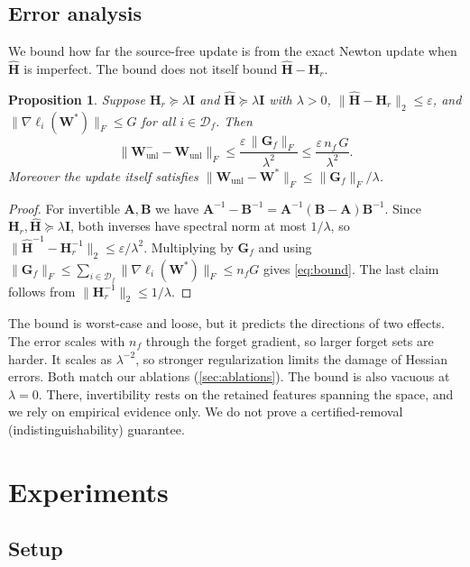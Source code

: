 \documentclass[10pt,twocolumn,letterpaper]{article}
\newtheorem{proposition}{Proposition}
\newcommand{\Hr}{\mathbf{H}_r}
\newcommand{\Hhat}{\widehat{\mathbf{H}}}
\newcommand{\Wstar}{\mathbf{W}^{*}}
\newcommand{\Df}{\mathcal{D}_f}
\begin{document}
\subsection{Error analysis}
\label{sec:analysis}
We bound how far the source-free update is from the exact Newton update when $\Hhat$ is imperfect. The bound does not itself bound $\Hhat-\Hr$.
\begin{proposition}
Suppose $\Hr\succeq\lambda\mathbf{I}$ and $\Hhat\succeq\lambda\mathbf{I}$ with $\lambda>0$, $\|\Hhat-\Hr\|_2\le\varepsilon$, and $\|\nabla\ell_i(\Wstar)\|_F\le G$ for all $i\in\Df$. Then
\begin{equation}
  \big\|\mathbf{W}_{\mathrm{unl}}^{-}-\mathbf{W}_{\mathrm{unl}}\big\|_F\le\frac{\varepsilon\,\|\mathbf{G}_f\|_F}{\lambda^{2}}\le\frac{\varepsilon\, n_f\, G}{\lambda^{2}}.
  \label{eq:bound}
\end{equation}
Moreover the update itself satisfies $\|\mathbf{W}_{\mathrm{unl}}-\Wstar\|_F\le \|\mathbf{G}_f\|_F/\lambda$.
\end{proposition}
\begin{proof}
For invertible $\mathbf{A},\mathbf{B}$ we have $\mathbf{A}^{-1}-\mathbf{B}^{-1}=\mathbf{A}^{-1}(\mathbf{B}-\mathbf{A})\mathbf{B}^{-1}$. Since $\Hr,\Hhat\succeq\lambda\mathbf{I}$, both inverses have spectral norm at most $1/\lambda$, so $\|\Hhat^{-1}-\Hr^{-1}\|_2\le\varepsilon/\lambda^2$. Multiplying by $\mathbf{G}_f$ and using $\|\mathbf{G}_f\|_F\le\sum_{i\in\Df}\|\nabla\ell_i(\Wstar)\|_F\le n_fG$ gives \cref{eq:bound}. The last claim follows from $\|\Hr^{-1}\|_2\le1/\lambda$.
\end{proof}
The bound is worst-case and loose, but it predicts the directions of two effects. The error scales with $n_f$ through the forget gradient, so larger forget sets are harder. It scales as $\lambda^{-2}$, so stronger regularization limits the damage of Hessian errors. Both match our ablations (\cref{sec:ablations}). The bound is also vacuous at $\lambda=0$. There, invertibility rests on the retained features spanning the space, and we rely on empirical evidence only. We do not prove a certified-removal (indistinguishability) guarantee.

\section{Experiments}
\label{sec:experiments}
\subsection{Setup}
\end{document}
